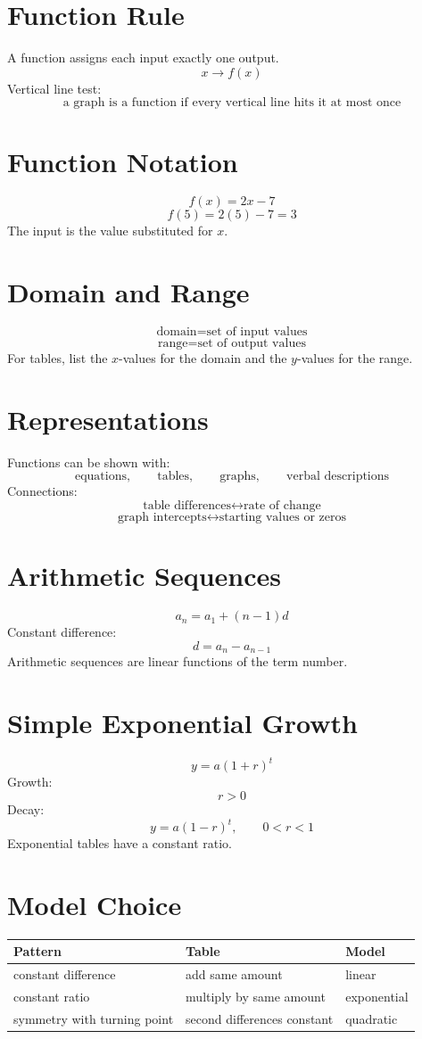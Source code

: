 \documentclass[11pt]{article}
\begin{document}

\section*{Function Rule}
A function assigns each input exactly one output.
\[
x\rightarrow f(x)
\]
Vertical line test:
\[
\text{a graph is a function if every vertical line hits it at most once}
\]

\section*{Function Notation}
\[
f(x)=2x-7
\]
\[
f(5)=2(5)-7=3
\]
The input is the value substituted for $x$.

\section*{Domain and Range}
\[
\text{domain}=\text{set of input values}
\]
\[
\text{range}=\text{set of output values}
\]
For tables, list the $x$-values for the domain and the $y$-values for the range.

\section*{Representations}
Functions can be shown with:
\[
\text{equations},\qquad \text{tables},\qquad \text{graphs},\qquad \text{verbal descriptions}
\]
Connections:
\[
\text{table differences}\leftrightarrow \text{rate of change}
\]
\[
\text{graph intercepts}\leftrightarrow \text{starting values or zeros}
\]

\section*{Arithmetic Sequences}
\[
a_n=a_1+(n-1)d
\]
Constant difference:
\[
d=a_n-a_{n-1}
\]
Arithmetic sequences are linear functions of the term number.

\section*{Simple Exponential Growth}
\[
y=a(1+r)^t
\]
Growth:
\[
r>0
\]
Decay:
\[
y=a(1-r)^t,\qquad 0<r<1
\]
Exponential tables have a constant ratio.

\section*{Model Choice}
\begin{center}
\begin{tabular}{lll}
\toprule
Pattern & Table & Model \\
\midrule
constant difference & add same amount & linear \\
constant ratio & multiply by same amount & exponential \\
symmetry with turning point & second differences constant & quadratic \\
\bottomrule
\end{tabular}
\end{center}
\end{document}
